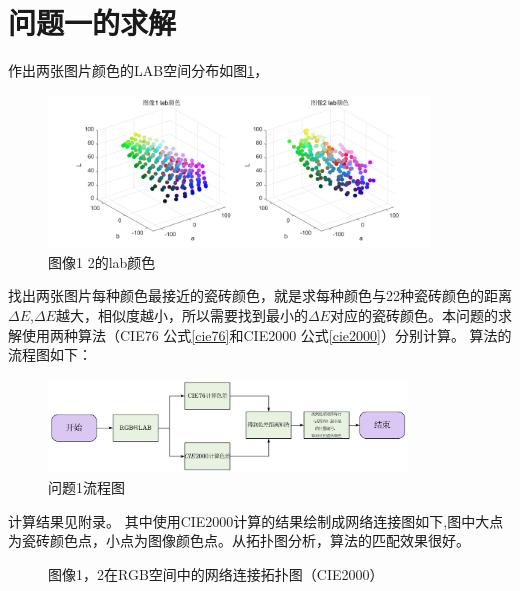 \documentclass{article}
\begin{document}
 \section{问题一的求解}
 作出两张图片颜色的LAB空间分布如图\ref{txlab}，
    \begin{figure}[H]
 	\centering
 	\includegraphics[width=0.9\textwidth]{img/图像12的lab颜色.png}
 	\caption{图像1 2的lab颜色}
 	\label{txlab}
 \end{figure}
 找出两张图片每种颜色最接近的瓷砖颜色，就是求每种颜色与22种瓷砖颜色的距离$\Delta E$,$\Delta E$越大，相似度越小，所以需要找到最小的$\Delta E$对应的瓷砖颜色。本问题的求解使用两种算法（CIE76 公式\eqref{cie76}和CIE2000 公式\eqref{cie2000}）分别计算。
 算法的流程图如下：
   \begin{figure}[H]
 	\centering
 	\includegraphics[width=0.85\textwidth]{img/问题1流程图.png}
 	\caption{问题1流程图}
 	\label{问题1流程图}
 \end{figure}
计算结果见附录。
其中使用CIE2000计算的结果绘制成网络连接图如下,图中大点为瓷砖颜色点，小点为图像颜色点。从拓扑图分析，算法的匹配效果很好。
	 \begin{figure}[H]
	\centering
	\quad
	\caption{图像1，2在RGB空间中的网络连接拓扑图（CIE2000）}
	\label{fig:rgbcie2000}
\end{figure}
\end{document}
